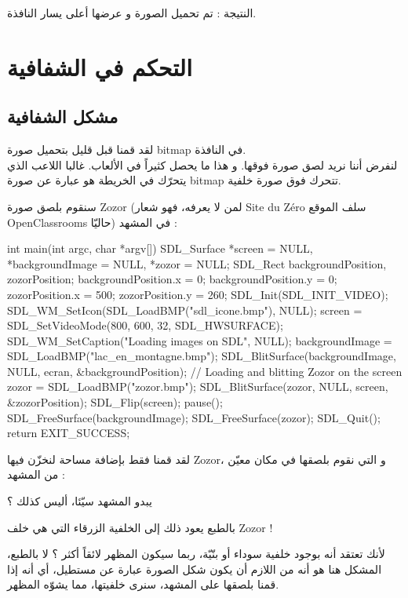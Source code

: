 النتيجة : تم تحميل الصورة و عرضها أعلى يسار النافذة.

\section{التحكم في الشفافية}

\subsection{مشكل الشفافية}

لقد قمنا قبل قليل بتحميل صورة 
\textenglish{bitmap}
في النافذة.\\
لنفرض أننا نريد لصق صورة فوقها. و هذا ما يحصل كثيراً في الألعاب. غالبا اللاعب الذي يتحرّك في الخريطة هو عبارة عن صورة 
\textenglish{bitmap}
تتحرك فوق صورة خلفية.

سنقوم بلصق صورة
\textenglish{Zozor}
(لمن لا يعرفه، فهو شعار
\textenglish{Site du Zéro}
سلف الموقع 
\textenglish{OpenClassrooms}
حاليّا) في المشهد :

\begin{Csource}
int main(int argc, char *argv[])
{
	SDL_Surface *screen = NULL, *backgroundImage = NULL, *zozor = NULL;
	SDL_Rect backgroundPosition, zozorPosition;
	backgroundPosition.x = 0;
	backgroundPosition.y = 0;
	zozorPosition.x = 500;
	zozorPosition.y = 260;
	SDL_Init(SDL_INIT_VIDEO);
	SDL_WM_SetIcon(SDL_LoadBMP("sdl_icone.bmp"), NULL);
	screen = SDL_SetVideoMode(800, 600, 32, SDL_HWSURFACE);
	SDL_WM_SetCaption("Loading images on SDL", NULL);
	backgroundImage = SDL_LoadBMP("lac_en_montagne.bmp");
	SDL_BlitSurface(backgroundImage, NULL, ecran, &backgroundPosition);
	// Loading and blitting Zozor on the screen
	zozor = SDL_LoadBMP("zozor.bmp");
	SDL_BlitSurface(zozor, NULL, screen, &zozorPosition);
	SDL_Flip(screen);
	pause();
	SDL_FreeSurface(backgroundImage);
	SDL_FreeSurface(zozor);
	SDL_Quit();
	return EXIT_SUCCESS;
}
\end{Csource}

لقد قمنا فقط بإضافة مساحة لنخزّن فيها 
\textenglish{Zozor}،
و التي نقوم بلصقها في مكان معيّن من المشهد :


يبدو المشهد سيّئا، أليس كذلك ؟

\begin{question}
بالطبع يعود ذلك إلى الخلفية الزرقاء التي هي خلف 
\textenglish{Zozor} !
\end{question}

لأنك تعتقد أنه بوجود خلفية سوداء أو بنّيّة، ربما سيكون المظهر لائقاً أكثر ؟ لا بالطبع، المشكل هنا هو أنه من اللازم أن يكون شكل الصورة عبارة عن مستطيل، أي أنه إذا قمنا بلصقها على المشهد، سنرى خلفيتها، مما يشوّه المظهر.

